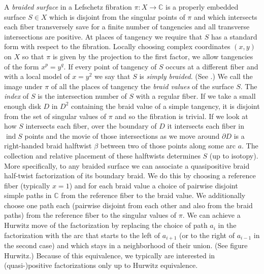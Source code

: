 \documentclass[11pt,letterpaper,reqno]{amsart}
\theoremstyle{remark}
\newcommand{\CC}{{\mathbb C}}
\DeclareMathOperator{\ind}{ind}
\begin{document}
A \emph{braided surface} in a Lefschetz fibration $\pi: X \rightarrow \CC$ is a properly embedded surface $S \in X$ which is disjoint from the singular points of $\pi$ and which intersects each fiber transversely save for a finite number of tangencies and all transverse intersections are positive. At places of tangency we require that $S$ has a standard form with respect to the fibration. Locally choosing complex coordinates $(x,y)$ on $X$ so that $\pi$ is given by the projection to the first factor, we allow tangencies of the form $x^p = y^q$. If every point of tangency of $S$ occurs at a different fiber and with a local model of $x = y^2$ we say that $S$ is \emph{simply braided}. (See \cite{AurouxKatzarkov}.) We call the image under $\pi$ of all the places of tangency the \emph{braid values} of the surface $S$. The \emph{index} of $S$ is the intersection number of $S$ with a regular fiber. If we take a small enough disk $D$ in $D^2$ containing the braid value of a simple tangency, it is disjoint from the set of singular values of $\pi$ and so the fibration is trivial. If we look at how $S$ intersects each fiber, over the boundary of $D$ it intersects each fiber in $\ind{S}$ points and the movie of those intersections as we move around $\partial D$ is a right-handed braid halftwist $\beta$ between two of those points along some arc $a$. The collection and relative placement of these halftwists determines $S$ (up to isotopy). More specifically, to any braided surface we can associate a quasipositive braid half-twist factorization of its boundary braid. We do this by choosing a reference fiber (typically $x=1$) and for each braid value a choice of pairwise disjoint simple paths in $\CC$ from the reference fiber to the braid value. We additionally choose one path each (pairwise disjoint from each other and also from the braid paths) from the reference fiber to the singular values of $\pi$. We can achieve a Hurwitz move of the factorization by replacing the choice of path $a_i$ in the factorization with the arc that starts to the left of $a_{i+1}$ (or to the right of $a_{i-1}$ in the second case) and which stays in a neighborhood of their union. (See figure Hurwitz.) Because of this equivalence, we typically are interested in (quasi-)positive factorizations only up to Hurwitz equivalence. 
\end{document}
